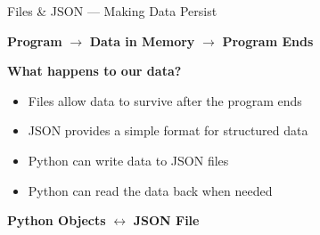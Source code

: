 \begin{frame}{Files \& JSON — Making Data Persist}

    \begin{center}
        \Large
        \textbf{Program}
        $\longrightarrow$
        \textbf{Data in Memory}
        $\longrightarrow$
        \textbf{Program Ends}
    \end{center}

    \vspace{0.6cm}

    \begin{center}
        \Large
        \textbf{What happens to our data?}
    \end{center}

    \vspace{0.6cm}

    \begin{itemize}
        \item Files allow data to survive after the program ends
        \item JSON provides a simple format for structured data
        \item Python can write data to JSON files
        \item Python can read the data back when needed
    \end{itemize}

    \vfill

    \begin{center}
        \Large
        \textbf{Python Objects}
        $\longleftrightarrow$
        \textbf{JSON File}
    \end{center}

\end{frame}
